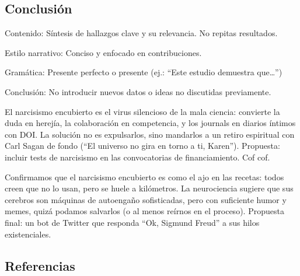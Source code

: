 \documentclass[
]{article}
\begin{document}
\subsection{Conclusión}\label{conclusiuxf3n}

\begin{tcolorbox}[enhanced jigsaw, leftrule=.75mm, title=\textcolor{quarto-callout-tip-color}{\faLightbulb}\hspace{0.5em}{Tip}, breakable, toptitle=1mm, colbacktitle=quarto-callout-tip-color!10!white, rightrule=.15mm, coltitle=black, bottomtitle=1mm, titlerule=0mm, left=2mm, colframe=quarto-callout-tip-color-frame, colback=white, arc=.35mm, bottomrule=.15mm, toprule=.15mm, opacitybacktitle=0.6, opacityback=0]

Contenido: Síntesis de hallazgos clave y su relevancia. No repitas
resultados.

Estilo narrativo: Conciso y enfocado en contribuciones.

Gramática: Presente perfecto o presente (ej.: ``Este estudio demuestra
que\ldots{}'')

Conclusión: No introducir nuevos datos o ideas no discutidas
previamente.

\end{tcolorbox}

El narcisismo encubierto es el virus silencioso de la mala ciencia:
convierte la duda en herejía, la colaboración en competencia, y los
journals en diarios íntimos con DOI. La solución no es expulsarlos, sino
mandarlos a un retiro espiritual con Carl Sagan de fondo (``El universo
no gira en torno a ti, Karen''). Propuesta: incluir tests de narcisismo
en las convocatorias de financiamiento. Cof cof.

Confirmamos que el narcisismo encubierto es como el ajo en las recetas:
todos creen que no lo usan, pero se huele a kilómetros. La neurociencia
sugiere que sus cerebros son máquinas de autoengaño sofisticadas, pero
con suficiente humor y memes, quizá podamos salvarlos (o al menos
reírnos en el proceso). Propuesta final: un bot de Twitter que responda
``Ok, Sigmund Freud'' a sus hilos existenciales.

\subsection*{Referencias}\label{referencias}
\end{document}
